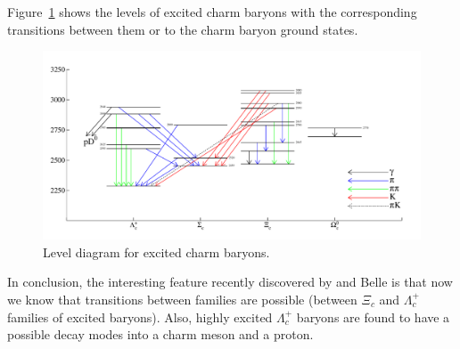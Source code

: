  

Figure~\ref{charm:leveldiagram} shows the levels of excited charm
baryons with the corresponding transitions between them or to the
charm baryon ground states.

\begin{figure}[!htb]
\includegraphics[width=1.0\textwidth]{./figures/charm/charm_baryons2014.pdf}
\caption{Level diagram for excited charm baryons.}
\label{charm:leveldiagram}
\end{figure} 

In conclusion, the interesting feature recently discovered by \babar
and Belle is that now we know that transitions between families are
possible (between $\Xi_c$ and $\Lambda_c^+$ families of excited
baryons). Also, highly excited $\Lambda_c^+$ baryons are found
to have a possible decay modes into a charm meson and a proton.    



